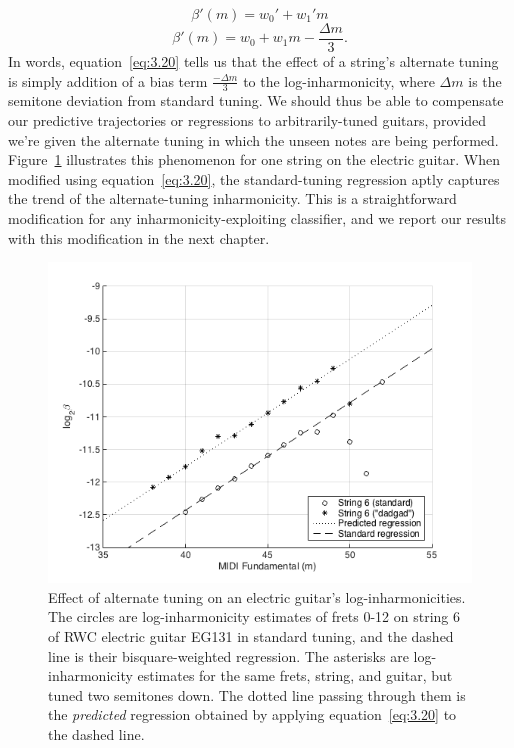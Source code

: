 \documentclass[12pt]{cmuthesis}
\begin{document}
\begin{equation}
\label{eq:3.19}
\beta'(m) = w_0' + w_1'm
\end{equation}
\begin{equation}
\label{eq:3.20}
\beta'(m) = w_0 + w_1m - \frac{\Delta m}{3}.
\end{equation}
In words, equation~\eqref{eq:3.20} tells us that the effect of a string's alternate tuning is simply addition of a bias term $\frac{-\Delta m}{3}$ to the log-inharmonicity, where $\Delta m$ is the semitone deviation from standard tuning. We should thus be able to compensate our predictive trajectories or regressions to arbitrarily-tuned guitars, provided we're given the alternate tuning in which the unseen notes are being performed. Figure~\ref{fig:tuning-eg} illustrates this phenomenon for one string on the electric guitar. When modified using equation~\eqref{eq:3.20}, the standard-tuning regression aptly captures the trend of the alternate-tuning inharmonicity. This is a straightforward modification for any inharmonicity-exploiting classifier, and we report our results with this modification in the next chapter.
\begin{figure}[!htbp] 
\label{fig:tuning-eg}
\centering
\includegraphics[scale=0.75]{tuning-eg}
\caption{Effect of alternate tuning on an electric guitar's log-inharmonicities. The circles are log-inharmonicity estimates of frets 0-12 on string 6 of RWC electric guitar EG131 in standard tuning, and the dashed line is their bisquare-weighted regression. The asterisks are log-inharmonicity estimates for the same frets, string, and guitar, but tuned two semitones down. The dotted line passing through them is the \textit{predicted} regression obtained by applying equation~\eqref{eq:3.20} to the dashed line.}
\end{figure}
\end{document}
